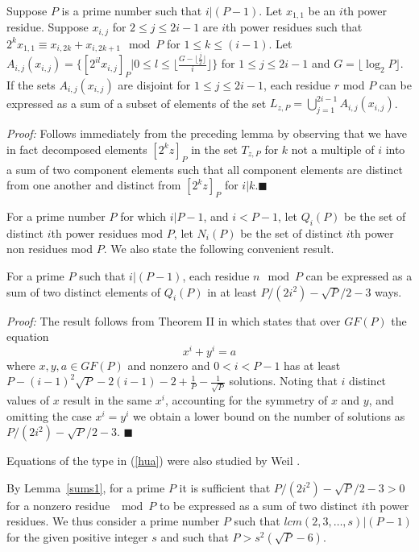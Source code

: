 \begin{lemma}\label{generates1} Suppose $P$ is a prime number such that $i|(P-1)$.
Let $x_{1,1}$ be an $i$th power residue. Suppose $x_{i,j}$ for $2
\leq j \leq 2i-1$ are $i$th power residues such that $2^{k}x_{1,1}
\equiv x_{i,2k}+x_{i,2k+1} \mod P$ for $1 \leq k \leq(i-1)$. Let
$A_{i,j}(x_{i,j}) =\{[2^{il}x_{i,j}]_P| 0 \leq l \leq \lfloor
\frac{G-\lfloor \frac{j}{2}\rfloor}{i}\rfloor\}$ for $1 \leq j \leq
2i-1$ and $G=\lfloor \log_2P \rfloor$. If the sets
$A_{i,j}(x_{i,j})$ are disjoint for $1 \leq j \leq 2i-1$, each
residue $r$ mod $P$ can be expressed as a sum of a subset of
elements of the set $L_{z,P}= \bigcup_{j=1}^{2i-1}
A_{i,j}(x_{i,j})$.
\end{lemma}
\noindent \textit{Proof:} Follows immediately from the preceding
lemma by observing that we have in fact decomposed elements
$[2^{k}z]_P$ in the set $T_{z,P}$ for $k$ not a multiple of $i$
into a sum of two component elements such that all component
elements are distinct from one another and distinct from
$[2^kz]_P$ for $i|k$.\hfill$\blacksquare$


For a prime number $P$ for which $i|P-1$, and $i<P-1$, let
$Q_i(P)$ be the set of distinct $i$th power residues mod $P$, let
$N_i(P)$ be the set of distinct $i$th power non residues mod $P$.
We also state the following convenient result.
\begin{lemma}\label{sums1}
For a prime $P$ such that $i | (P-1)$, each residue $n \mod P$ can
be expressed as a sum of two distinct elements of $Q_i(P)$ in at
least $P/(2i^2)-\sqrt{P}/2-3$ ways.
\end{lemma}
\noindent \textit{Proof:} The result follows from Theorem II in
\cite{huavan:49} which states that over $GF(P)$ the equation
\begin{equation}\label{hua} x^i+y^i=a
\end{equation} where $x,y,a \in GF(P)$ and nonzero and $0 < i <P-1 $
has at least
$P-(i-1)^2\sqrt{P}-2(i-1)-2+\frac{1}{P}-\frac{1}{\sqrt{P}}$
solutions. Noting that $i$ distinct values of $x$ result in the
same $x^i$, accounting for the symmetry of $x$ and $y$, and
omitting the case $x^i=y^i$ we obtain a lower bound on the number
of solutions as $P/(2i^2)-\sqrt{P}/2-3$. \hfill$\blacksquare$

Equations of the type in (\ref{hua}) were also studied by Weil
\cite{weil:49}.



By Lemma~\ref{sums1}, for a prime $P$ it is sufficient that
$P/(2i^2)-\sqrt{P}/2-3>0$ for a nonzero residue $\mod P$ to be
expressed as a sum of two distinct $i$th power residues. We thus
consider a prime number $P$ such that $lcm(2,3,\dots,s)|(P-1)$ for
the given positive integer $s$ and such that $P>s^2(\sqrt{P}-6)$.

